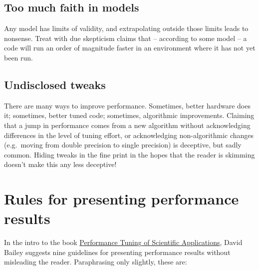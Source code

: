 \documentclass[12pt, leqno]{article} %
\begin{document}
\subsection{Too much faith in models}

Any model has limits of validity, and extrapolating outside those limits
leads to nonsense. Treat with due skepticism claims that -- according to
some model -- a code will run an order of magnitude faster in an
environment where it has not yet been run.

\subsection{Undisclosed tweaks}

There are many ways to improve performance. Sometimes, better hardware
does it; sometimes, better tuned code; sometimes, algorithmic
improvements. Claiming that a jump in performance comes from a new
algorithm without acknowledging differences in the level of tuning
effort, or acknowledging non-algorithmic changes (e.g.~moving from
double precision to single precision) is deceptive, but sadly common.
Hiding tweaks in the fine print in the hopes that the reader is skimming
doesn't make this any less deceptive!

\section{Rules for presenting performance results}

In the intro to the book
\href{http://www.lifescied.org/content/13/2/179.abstract}{Performance
Tuning of Scientific Applications}, David Bailey suggests nine
guidelines for presenting performance results without misleading the
reader. Paraphrasing only slightly, these are:
\end{document}
